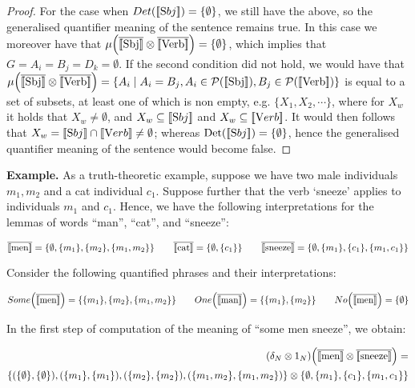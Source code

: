 \begin{proof}
For the case when $Det([\![ \text Sbj ]\!]) = \{\emptyset\}$, we still have the above, so the generalised quantifier meaning of the sentence remains true. In this case we moreover  have that $\mu\Big(\overline{[\![ \text{Sbj} ]\!]} \otimes \overline{[\![ \text{Verb} ]\!]} \Big) = \{\emptyset\}$, which implies that  $G= A_i = B_j = D_k = \emptyset$. If the second condition did not hold, we would have that $\mu\Big(\overline{\semantics{\text{Sbj}}} \otimes \overline{\semantics{\text{Verb}}} \Big) = \{A_i \mid A_i = B_j, A_i \in {\cal P} (\semantics{\text{Sbj}}), B_j \in  {\cal P}(\semantics{\text{Verb}})\}$ is equal to a set of subsets, at least one of which is non empty, e.g.  $\{X_1, X_2, \cdots\}$, where for  $X_w$ it holds that $X_w \neq \emptyset$, and $X_w \subseteq [\![ \text Sbj ]\!]$ and $X_w \subseteq [\![ \text Verb ]\!]$. It would then follows that  $X_w = [\![ \text Sbj ]\!] \cap [\![ \text Verb ]\!] \neq \emptyset$;  whereas $\mathrm{Det}([\![ \text Sbj ]\!]) = \{\emptyset\}$, hence the generalised quantifier meaning of the sentence would become false. 


\end{proof}

\bigskip
\noindent
{\bf Example.} As a truth-theoretic  example,  suppose we have two male individuals $m_1, m_2$  and a cat   individual $c_1$.  Suppose further that  the verb `sneeze'  applies to individuals $m_1$ and $c_1$. Hence, we have the following interpretations for the lemmas of words ``man'', ``cat'', and ``sneeze'':

\[
\overline{[\![ \text{men} ]\!]} =  \{\emptyset,  \{m_1\}, \{m_2\}, \{m_1, m_2\}\}  \qquad
\overline{[\![ \text{cat} ]\!]} =  \{\emptyset, \{c_1\}\}  \qquad
\overline{[\![ \text{sneeze} ]\!]} = \{\emptyset, \{m_1\}, \{c_1\}, \{m_1, c_1\}\}
\]

\noindent
Consider the  following quantified phrases and their interpretations:

\[
Some\Big(\overline{[\![ \text{men} ]\!]}\Big) =  \{\{m_1\}, \{m_2\}, \{m_1, m_2\}\} \qquad
One\Big(\overline{[\![ \text{man} ]\!]}\Big) = \{\{m_1\}, \{m_2\}\} \qquad 
No\Big(\overline{[\![ \text{men} ]\!]}\Big) = \{\emptyset\}
\]

\noindent
In the first step of computation of the meaning of  ``some men sneeze'', we obtain:

\begin{align*}
(\delta_N \otimes 1_{N})\Big(\overline{[\![ \text{men} ]\!]} \otimes \overline{[\![ \text{sneeze} ]\!]}\Big) =&\\
  \{(\{\emptyset\}, \{\emptyset\}), (\{m_1\}, \{m_1\}), (\{m_2\}, \{m_2\}), (\{m_1, m_2\}, \{m_1, m_2\}) \} \otimes  \{\emptyset, \{m_1\}, \{c_1\}, \{m_1, c_1\}\} 
\end{align*}

